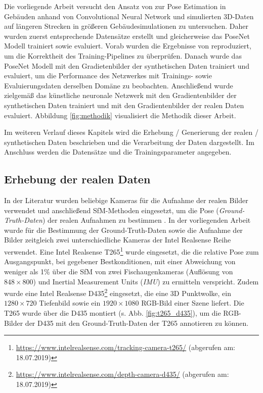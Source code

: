Die vorliegende Arbeit versucht den Ansatz von \citet{acharyaBIMPoseNetIndoorCamera2019} zur Pose Estimation in Gebäuden anhand von Convolutional Neural Network und simulierten 3D-Daten auf längeren Strecken in größeren Gebäudesimulationen zu untersuchen. Daher wurden zuerst entsprechende Datensätze erstellt und gleicherweise das PoseNet Modell trainiert sowie evaluiert. Vorab wurden die Ergebnisse von  \citet{acharyaBIMPoseNetIndoorCamera2019} reproduziert, um die Korrektheit des Training-Pipelines zu überprüfen. Danach wurde das PoseNet Modell mit den Gradietenbilder der synthetischen Daten trainiert und evaluiert, um die Performance des Netzwerkes mit Trainings- sowie Evaluierungsdaten derselben Domäne zu beobachten. Anschließend wurde zielgemäß das künstliche neuronale Netzwerk mit den Gradientenbilder der synthetischen Daten trainiert und mit den Gradientenbilder der realen Daten evaluiert. Abbildung \ref{fig:methodik} visualisiert die Methodik dieser Arbeit.


Im weiteren Verlauf dieses Kapitels wird die Erhebung / Generierung der realen / synthetischen Daten beschrieben und die Verarbeitung der Daten dargestellt. Im Anschluss werden die Datensätze und die Trainingsparameter angegeben. 



\subsection{Erhebung der realen Daten}
\label{subsec:record_real_data}
In der Literatur wurden beliebige Kameras für die Aufnahme der realen Bilder verwendet und anschließend SfM-Methoden eingesetzt, um die Pose (\textit{Ground-Truth-Daten}) der realen Aufnahmen zu bestimmen \cite{kendallPoseNetConvolutionalNetwork2015, clarkVidLocDeepSpatioTemporal2017, acharyaBIMPoseNetIndoorCamera2019}. 
In der vorliegenden Arbeit wurde für die Bestimmung der Ground-Truth-Daten sowie die Aufnahme der Bilder zeitgleich zwei unterschiedliche Kameras der Intel Realsense Reihe verwendet. Eine Intel Realsense T265\footnote{\url{https://www.intelrealsense.com/tracking-camera-t265/} (abgerufen am: 18.07.2019)} wurde eingesetzt, die die relative Pose zum Ausgangspunkt, bei gegebener Bestkonditionen, mit einer Abweichung von weniger als 1\% über die SfM von zwei Fischaugenkameras (Auflösung von $848 \times 800$) und Inertial Measurement Units (\textit{IMU}) zu ermitteln verspricht. Zudem wurde eine Intel Realsense D435\footnote{ \url{https://www.intelrealsense.com/depth-camera-d435/} (abgerufen am: 18.07.2019)} eingesetzt, die eine 3D Punktwolke, ein $1280\times720$ Tiefenbild sowie ein $1920\times1080$ RGB-Bild einer Szene liefert. Die T265 wurde über die D435 montiert (s. Abb. \ref{fig:t265_d435}), um die RGB-Bilder der D435 mit den Ground-Truth-Daten der T265 annotieren zu können.

